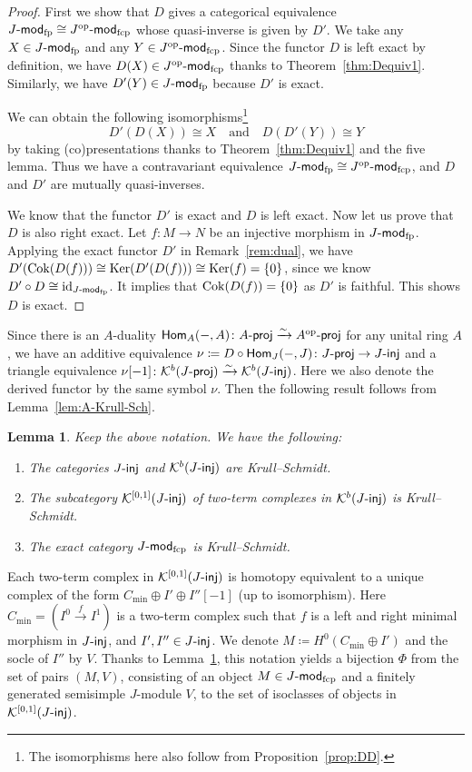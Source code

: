 \documentclass[12pt]{amsart}
\newtheorem{lemma}[theorem]{Lemma}
\theoremstyle{definition}
\theoremstyle{remark}
\numberwithin{equation}{section}
\newcommand{\opname}[1]{\operatorname{\mathsf{#1}}}
\newcommand{\Hom}{\opname{Hom}}
\newcommand{\injc}{\mathchar`-\mathsf{inj}}
\newcommand{\projc}{\mathchar`-\mathsf{proj}}
\newcommand{\cK}{\mathcal{K}}
\newcommand{\modfp}{\mathchar`-\mathsf{mod}_{\mathrm{fp}}}
\newcommand{\modfcp}{\mathchar`-\mathsf{mod}_{\mathrm{fcp}}}
\newcommand{\op}{\mathrm{op}}
\begin{document}
\begin{proof}
    First we show that $D$ gives a categorical equivalence $J\modfp \cong J^\op\modfcp$ whose quasi-inverse is given by $D'$. We take any $X\in J\modfp$ and any $Y\in J^\op\modfcp$. Since the functor $D$ is left exact by definition, we have $D(X)\in J^\op\modfcp$ thanks to Theorem~\ref{thm:Dequiv1}. Similarly, we have $D'(Y)\in J\modfp$ because $D'$ is exact.
     
We can obtain the following isomorphisms\footnote{The isomorphisms here  also follow from Proposition~\ref{prop:DD}.} 
\[D'(D (X))\cong X\quad\text{and}\quad  D(D'(Y))\cong Y\]
by taking (co)presentations thanks to Theorem~\ref{thm:Dequiv1} and the five lemma.  Thus we have a contravariant equivalence $J\modfp \cong J^\op\modfcp$, and $D$ and $D'$ are mutually quasi-inverses.

We know that the functor $D'$ is exact and $D$ is left exact. Now let us prove that $D$ is also right exact. Let $f: M\to N$ be an injective morphism in $J\modfp$. Applying the exact functor $D'$ in Remark~\ref{rem:dual}, we have $D'(\mathrm{Cok}(D(f))) \cong \mathrm{Ker}(D'(D(f))) \cong  \mathop{\rm{Ker}}(f) = \{ 0 \}$, since we know $D' \circ D \cong \mathop{\rm{id}}_{J\modfp}$. It implies that  $\mathop{\rm{Cok}}(D(f))=\{0\}$ as $D'$ is faithful. This shows $D$ is exact.
\end{proof} 
Since there is an $A$-duality $\Hom_{A}(-, A)\colon A\projc \xrightarrow{\sim} A^\op\projc$ for any unital ring $A$, we have an additive equivalence $\nu\coloneqq D\circ \Hom_{J}(-, J)\colon J\projc \to J\injc$ and a triangle equivalence $\nu[-1]\colon \cK^b(J\projc)\xrightarrow{\sim} \cK^b(J\injc)$. Here we also denote the derived functor by the same symbol $\nu$. Then the following result follows from Lemma~\ref{lem:A-Krull-Sch}.
\begin{lemma}\label{lem:injKS}
    Keep the above notation. We have the following:
    \begin{enumerate}
        \item[(i)] The categories $J\injc$ and $\cK^b(J\injc)$ are Krull--Schmidt.
        \item[(ii)] The subcategory $\cK^{[0, 1]}(J\injc)$ of two-term complexes in  $\cK^b(J\injc)$ is Krull--Schmidt.
        \item[(iii)] The exact category $J\modfcp$ is Krull--Schmidt.
    \end{enumerate}
\end{lemma}
 Each two-term complex in $\cK^{[0, 1]}(J\injc)$ is homotopy equivalent to a unique complex of the form $C_{\mathrm{min}}\oplus I'\oplus I''[-1]$ (up to isomorphism). Here $C_{\mathrm{min}}=(I^0\xrightarrow{f} I^1)$ is a two-term complex such that $f$ is a left and right minimal morphism in $J\injc$, and $I', I''\in J\injc$.
 We denote $M\coloneqq H^0(C_{\mathrm{min}}\oplus I')$ and the socle of $I''$ by $V$.
 Thanks to Lemma~\ref{lem:injKS}, this notation yields a bijection $\Phi$ from the set of pairs $(M, V)$, consisting of an object $M\in J\modfcp$ and a finitely generated semisimple $J$-module $V$, to the set of isoclasses of objects in $\cK^{[0, 1]}(J\injc)$.
\end{document}
